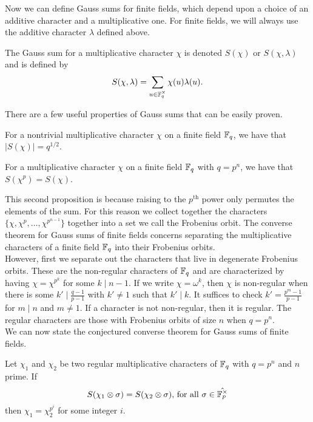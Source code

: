 Now we can define Gauss sums for finite fields, which depend upon a choice of an additive character and a multiplicative one. 
For finite fields, we will always use the additive character $\lambda$ defined above.
\begin{defn}\label{def:Gsum-FF}
The Gauss sum for a multiplicative character $\chi$ is denoted $S(\chi)$ or $S(\chi, \lambda)$ and is defined by \[S(\chi, \lambda) = \sum_{u \in \mathbb{F}_q^\times} \chi(u) \lambda(u).\]
\end{defn}
\noindent There are a few useful properties of Gauss sums that can be easily proven.
\begin{prop}
For a nontrivial multiplicative character $\chi$ on a finite field $\mathbb{F}_q$, we have that $|S(\chi)| = q^{1/2}$.
\end{prop}
\begin{prop}
For a multiplicative character $\chi$ on a finite field $\mathbb{F}_q$ with $q = p^n$, we have that $S(\chi^p) = S(\chi)$.
\end{prop}
This second proposition is because raising to the $p^\text{th}$ power only permutes the elements of the sum. 
For this reason we collect together the characters $\{\chi, \chi^{p}, \ldots, \chi^{p^{n-1}}\}$ together into a set we call the Frobenius orbit.
The converse theorem for Gauss sums of finite fields concerns separating the multiplicative characters of a finite field $\mathbb{F}_q$ into their Frobenius orbits.\\

However, first we separate out the characters that live in degenerate Frobenius orbits. 
These are the non-regular characters of $\mathbb{F}_q$ and are characterized by having $\chi = \chi^{p^k}$ for some $k \mid n-1$. 
If we write $\chi = \omega^k$, then $\chi$ is non-regular when there is some $k' \mid \frac{q-1}{p-1}$ with $k' \neq 1$ such that $k' \mid k$.
It suffices to check $k' = \frac{p^m - 1}{p-1}$ for $m \mid n$ and $m \neq 1$.
If a character is not non-regular, then it is regular. 
The regular characters are those with Frobenius orbits of size $n$ when $q = p^n$.\\

We can now state the conjectured converse theorem for Gauss sums of finite fields.
\begin{conj}[Nien]\label{conj:local-converse-FF}
Let $\chi_1$ and $\chi_2$ be two regular multiplicative characters of $\mathbb{F}_q$ with $q = p^n$ and $n$ prime. If \[S(\chi_1 \otimes \sigma) = S(\chi_2 \otimes \sigma)\text{, for all } \sigma \in \hat{\mathbb{F}_p^\times}\] then $\chi_1 = \chi_2^{p^i}$ for some integer $i$.
\end{conj}

